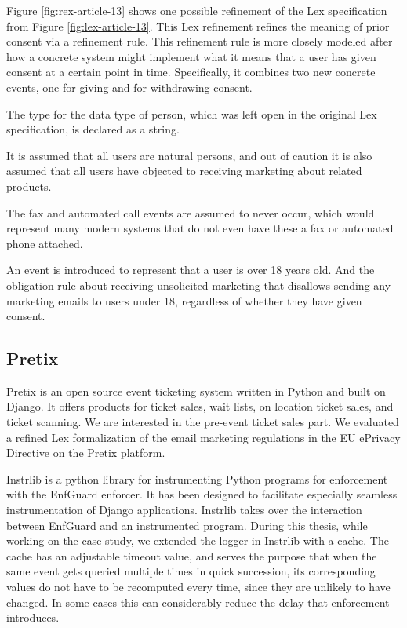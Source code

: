 Figure \ref{fig:rex-article-13} shows one possible refinement
of the Lex specification from Figure \ref{fig:lex-article-13}.
This Lex refinement refines the meaning of prior consent
via a refinement rule.
This refinement rule is more closely modeled after how
a concrete system might implement what it means that
a user has given consent at a certain point in time.
Specifically, it combines two new concrete events,
one for giving and for withdrawing consent.

The type for the data type of person, which was
left open in the original Lex specification,
is declared as a string.

It is assumed that all users are natural persons,
and out of caution it is also assumed
that all users have objected to receiving
marketing about related products.

The fax and automated call events are assumed to never occur,
which would represent many modern systems that do
not even have these a fax or automated phone attached.

An event is introduced to represent that a user is over 18 years old.
And the obligation rule about receiving unsolicited marketing
that disallows sending any marketing emails to users
under 18, regardless of whether they have given consent.

\subsection{Pretix}
Pretix \cite{PretixReinventingTicket}
is an open source event ticketing system
written in Python and built on Django.
It offers products for ticket sales, wait lists,
on location ticket sales, and ticket scanning.
We are interested in the pre-event ticket sales part.
We evaluated a refined Lex formalization of the email marketing
regulations in the EU ePrivacy Directive on the Pretix
platform.

Instrlib \cite{instrlib} is a python library for instrumenting Python
programs for enforcement with the EnfGuard \cite{whyenf} enforcer.
It has been designed to facilitate especially seamless instrumentation
of Django applications.
Instrlib takes over the interaction between EnfGuard and an
instrumented program.
During this thesis, while working on the case-study, we extended
the logger in Instrlib with a cache.
The cache has an adjustable timeout value, and serves the purpose that
when the same event gets queried multiple times in quick
succession, its corresponding values do not have to be recomputed
every time, since they are unlikely to have changed.
In some cases this can considerably reduce the delay that
enforcement introduces.

